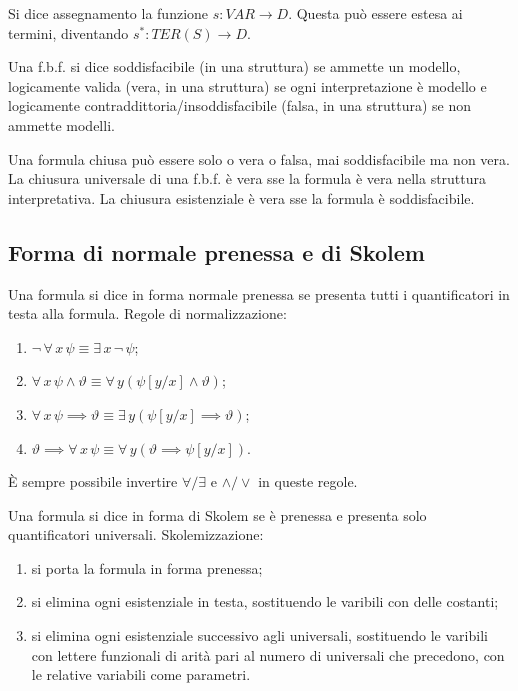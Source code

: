 \documentclass[10pt]{article}
\begin{document}
            Si dice assegnamento la funzione \(s : VAR \to D\). Questa può essere estesa ai termini, diventando \(s^* : TER(S) \to D\).

            Una f.b.f. si dice soddisfacibile (in una struttura) se ammette un modello, logicamente valida (vera, in una struttura) se
            ogni interpretazione è modello e logicamente contraddittoria/insoddisfacibile (falsa, in una struttura) se non ammette
            modelli.

            Una formula chiusa può essere solo o vera o falsa, mai soddisfacibile ma non vera. La chiusura universale di una f.b.f. è
            vera sse la formula è vera nella struttura interpretativa. La chiusura esistenziale è vera sse la formula è soddisfacibile.

        \subsection*{Forma di normale prenessa e di Skolem}

            Una formula si dice in forma normale prenessa se presenta tutti i quantificatori in testa alla formula. Regole di
            normalizzazione:
            \begin{enumerate}
                \item \(\neg \, \forall \, x \, \psi \equiv \exists \, x \, \neg \, \psi\);
                \item \(\forall \, x \, \psi \land \vartheta \equiv \forall \, y \left(\psi [y/x] \land \vartheta\right)\);
                \item \(\forall \, x \, \psi \implies \vartheta \equiv \exists \, y \left(\psi [y/x] \implies \vartheta\right)\);
                \item \(\vartheta \implies \forall \, x \, \psi \equiv \forall \, y \left(\vartheta \implies \psi [y/x]\right)\).
            \end{enumerate}
            È sempre possibile invertire \(\forall/\exists\) e \(\land/\lor\) in queste regole.
            
            Una formula si dice
            in forma di Skolem se è prenessa e presenta solo quantificatori universali. Skolemizzazione:
            \begin{enumerate}
                \item si porta la formula in forma prenessa;
                \item si elimina ogni esistenziale in testa, sostituendo le varibili con delle costanti;
                \item si elimina ogni esistenziale successivo agli universali, sostituendo le varibili con lettere funzionali di
                    arità pari al numero di universali che precedono, con le relative variabili come parametri.
            \end{enumerate}
\end{document}

